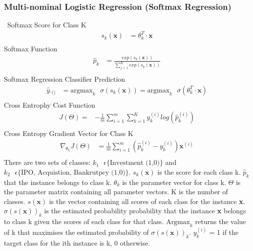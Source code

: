 \documentclass[12pt]{article}
\begin{document}
\subsubsection{Multi-nominal Logistic Regression (Softmax Regression)}\label{mnlr-sr-math}\
Softmax Score for Class K
\begin{align}
	s_{k}(\textbf{x}) &= \theta_{k}^{T} \cdot \textbf{x} \\
\end{align}
Softmax Function
\begin{align}
	\hat{p}_{k} &= \frac{exp(s_{k}(\textbf{x}))}{\sum_{j=1}^{K}exp(s_{k}(\textbf{x}))}\\
\end{align}
Softmax Regression Classifier Prediction
\begin{align}
	\hat{y}._{\text{()}} &= \text{argmax}_{k} \text{ }\sigma(s_{k}(\textbf{x})) = \text{argmax}_{k} \text{ } \sigma(\theta_{k}^{T} \cdot \textbf{x}) \\
\end{align}
Cross Entrophy Cost Function
\begin{align}
	J(\Theta) =& -\frac{1}{m}\sum_{i=1}^{m}\sum_{k=1}^{K}y_{k}^{(i)}log(\hat{p}_{k}^{(i)})\\
\end{align}
Cross Entropy Gradient Vector for Class K
\begin{align}
	\nabla_{\theta_{k}}J(\Theta) &= \frac{1}{m}\sum_{i=1}^{m}(\hat{p}_{k}^{(i)}-y_{k}^{(i)}) \textbf{x}^{(i)}\\
\end{align}
There are two sets of classes: $k_{1} \text{ }\epsilon \{\text{Investment (1,0)}\}$ and $k_{2} \text{ } \epsilon \{\text{IPO, Acquistion, Bankrutpcy (1,0)}\}$.
$s_{k}(\textbf{x})$ is the score for each class k. 
$\hat{p}_{k}$ that the instance belongs to class k. 
$\theta_k$ is the parameter vector for class k.
$\Theta$ is the parameter matrix containing all parameter vectors.
K is the number of classes.
$s(\textbf{x})$ is the vector containing all scores of each class for the instance \textbf{x}.
$\sigma(s(\textbf{x}))_{k}$ is the estimated probability probability that the instance \textbf{x} belongs to class k given the scores of each class for that class.
$\text{Argmax}_{k}$ returns the value of k that maximises the estimated probability of $\sigma(s(\textbf{x}))_{k}$.
$y_k^{(i)}$ = 1 if the target class for the ith instance is k, 0 otherwise.
\end{document}
